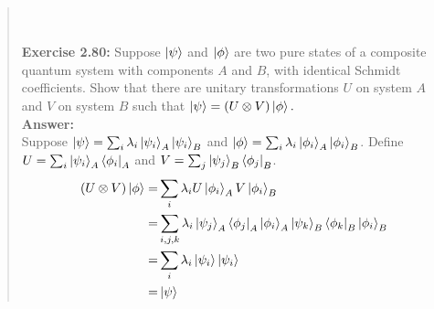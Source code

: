 \documentclass[UTF8]{ctexart}
\begin{document}
\begin{quote}
\begin{equation}
\end{equation}
\\
\\
\textbf{Exercise 2.80: } Suppose $ \ket{\psi}$  and $\ket{\phi}$ are two pure states of a composite quantum 
system with components $A$ and $B$, with identical Schmidt coefficients. Show that there are unitary 
transformations $U$ on system $A$ and $V$ on system $B$ such that $\ket{\psi} = (U \otimes V )\ket{\phi}.$
 \\
\textbf{Answer:}	 \\
Suppose $\ket{\psi}=\sum_{i}\lambda_{i}\ket{\psi_{i}}_{A}\ket{\psi_{i}}_{B}$ and  $\ket{\phi}=\sum_{i}\lambda_{i}\ket{\phi_{i}}_{A}\ket{\phi_{i}}_{B}$.
Define $U=\sum_{i}\ket{\psi_{i}}_{A}\bra{\phi_{i}}_{A}$ and $V=\sum_{j}\ket{\psi_{j}}_{B}\bra{\phi_{j}}_{B}$.
\begin{equation}
	\begin{aligned}
		(U \otimes V )\ket{\phi}=&\sum_{i}\lambda_{i}U\ket{\phi_{i}}_{A}V\ket{\phi_{i}}_{B} \\
								=&\sum_{i,j,k}\lambda_{i}\ket{\psi_{j}}_{A}\bra{\phi_{j}}_{A}\ket{\phi_{i}}_{A}\ket{\psi_{k}}_{B}\bra{\phi_{k}}_{B}\ket{\phi_{i}}_{B} \\
								=&\sum_{i}\lambda_{i}\ket{\psi_{i}}\ket{\psi_{i}}\\
								=&\ket{\psi} \\
	\end{aligned}
\end{equation}
\end{quote}
\end{document}
